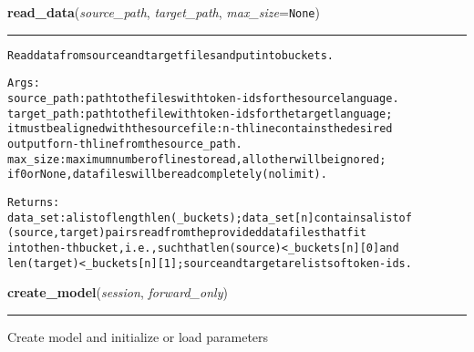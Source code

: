 \hspace{.8\funcindent}\begin{boxedminipage}{\funcwidth}

    \raggedright \textbf{read\_data}(\textit{source\_path}, \textit{target\_path}, \textit{max\_size}={\tt None})

    \vspace{-1.5ex}

    \rule{\textwidth}{0.5\fboxrule}
\setlength{\parskip}{2ex}
\begin{alltt}
Read data from source and target files and put into buckets.

Args:
  source\_path: path to the files with token-ids for the source language.
  target\_path: path to the file with token-ids for the target language;
    it must be aligned with the source file: n-th line contains the desired
    output for n-th line from the source\_path.
  max\_size: maximum number of lines to read, all other will be ignored;
    if 0 or None, data files will be read completely (no limit).

Returns:
  data\_set: a list of length len(\_buckets); data\_set[n] contains a list of
    (source, target) pairs read from the provided data files that fit
    into the n-th bucket, i.e., such that len(source) {\textless} \_buckets[n][0] and
    len(target) {\textless} \_buckets[n][1]; source and target are lists of token-ids.
\end{alltt}

\setlength{\parskip}{1ex}
    \end{boxedminipage}

    \label{Chatbot:execute:create_model}

    \vspace{0.5ex}

\hspace{.8\funcindent}\begin{boxedminipage}{\funcwidth}

    \raggedright \textbf{create\_model}(\textit{session}, \textit{forward\_only})

    \vspace{-1.5ex}

    \rule{\textwidth}{0.5\fboxrule}
\setlength{\parskip}{2ex}
    Create model and initialize or load parameters

\setlength{\parskip}{1ex}
    \end{boxedminipage}

